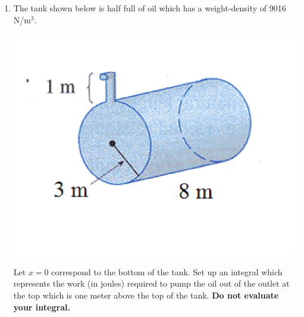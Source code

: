 \documentclass[12pt]{article}
\newif\ifans
\begin{document}
\begin{enumerate}
\ifans{\fbox{1,456 ft$\cdot$lb}} \fi

\item The tank shown below is half full of oil which has a weight-density of 9016 N/m$^3$.  
\begin{center}
\includegraphics[scale=0.3]{tank.pdf}
\end{center}
Let $x=0$ correspond to the bottom of the tank.  Set up an integral which represents the work (in joules) required to pump the oil out of the outlet at the top which is one meter above the top of the tank.  {\bf Do not evaluate your integral.}

\ifans{\fbox{$W=\int_0^3 9016 \cdot 8 \cdot 2 \cdot \sqrt{9-(3-x)^2} \cdot (7-x) \,dx= 144,256 \int_0^3 (7-x)\sqrt{6x-x^2}\,dx$ J}} \fi

\end{enumerate}
\end{document}
